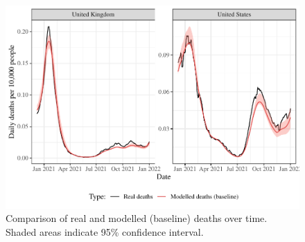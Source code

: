 \documentclass{article}
\begin{document}
\begin{figure}[H]

{\centering \includegraphics[height=0.4\textheight,]{_main_files/figure-latex/model-fit-deaths-1}

}

\caption{Comparison of real and modelled (baseline) deaths over time. Shaded areas indicate 95\% confidence interval.}\label{fig:model-fit-deaths}
\end{figure}
\end{document}
